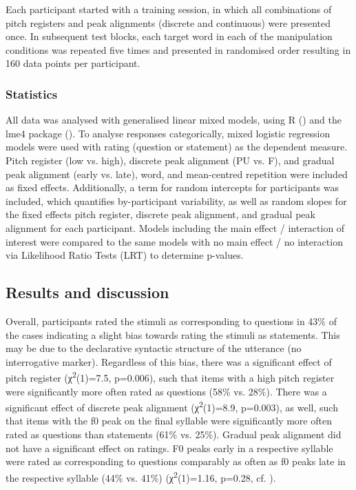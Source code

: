 Each participant started with a training session, in which all combinations of pitch registers and peak alignments (discrete and continuous) were presented once. In subsequent test blocks, each target word in each of the manipulation conditions was repeated five times and presented in randomised order resulting in 160 data points per participant.

\subsubsection{Statistics}
All data was analysed with generalised linear mixed models, using R (\citealt{R}) and the lme4 package (\citealt{Bates.etal2014}). To analyse responses categorically, mixed logistic regression models were used with rating (question or statement) as the dependent measure. Pitch register (low vs. high), discrete peak alignment (PU vs. F), and gradual peak alignment (early vs. late), word, and mean-centred repetition were included as fixed effects. Additionally, a term for random intercepts for participants was included, which quantifies by-participant variability, as well as random slopes for the fixed effects pitch register, discrete peak alignment, and gradual peak alignment for each participant. Models including the main effect / interaction of interest were compared to the same models with no main effect / no interaction via Likelihood Ratio Tests (LRT) to determine p-values.

\subsection{Results and discussion}
Overall, participants rated the stimuli as corresponding to questions in 43\% of the cases indicating a slight bias towards rating the stimuli as statements. This may be due to the declarative syntactic structure of the utterance (no interrogative marker). Regardless of this bias, there was a significant effect of pitch register (χ\textsuperscript{2}(1)=7.5, p=0.006), such that items with a high pitch register were significantly more often rated as questions (58\% vs. 28\%). There was a significant effect of discrete peak alignment (χ\textsuperscript{2}(1)=8.9, p=0.003), as well, such that items with the f0 peak on the final syllable were significantly more often rated as questions than statements (61\% vs. 25\%). Gradual peak alignment did not have a significant effect on ratings. F0 peaks early in a respective syllable were rated as corresponding to questions comparably as often as f0 peaks late in the respective syllable (44\% vs. 41\%) (χ\textsuperscript{2}(1)=1.16, p=0.28, cf. ).

